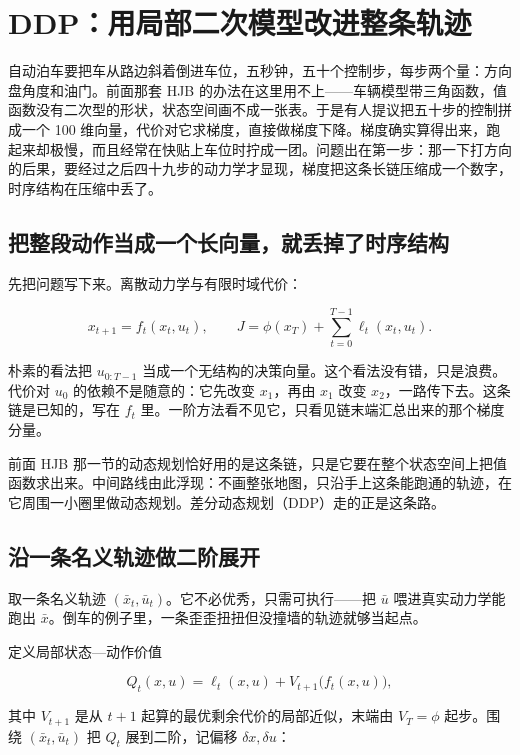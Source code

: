 \section{DDP：用局部二次模型改进整条轨迹}
\label{sec:16-Control-and-Reinforcement-Learning/01-Optimal-Control/06}

自动泊车要把车从路边斜着倒进车位，五秒钟，五十个控制步，每步两个量：方向盘角度和油门。前面那套 HJB 的办法在这里用不上——车辆模型带三角函数，值函数没有二次型的形状，状态空间画不成一张表。于是有人提议把五十步的控制拼成一个 100 维向量，代价对它求梯度，直接做梯度下降。梯度确实算得出来，跑起来却极慢，而且经常在快贴上车位时拧成一团。问题出在第一步：那一下打方向的后果，要经过之后四十九步的动力学才显现，梯度把这条长链压缩成一个数字，时序结构在压缩中丢了。

\subsection{把整段动作当成一个长向量，就丢掉了时序结构}

先把问题写下来。离散动力学与有限时域代价：

\[
x_{t+1} = f_t(x_t, u_t),
\qquad
J = \phi(x_T) + \sum_{t=0}^{T-1} \ell_t(x_t, u_t).
\]

朴素的看法把 \(u_{0:T-1}\) 当成一个无结构的决策向量。这个看法没有错，只是浪费。代价对 \(u_0\) 的依赖不是随意的：它先改变 \(x_1\)，再由 \(x_1\) 改变 \(x_2\)，一路传下去。这条链是已知的，写在 \(f_t\) 里。一阶方法看不见它，只看见链末端汇总出来的那个梯度分量。

前面 HJB 那一节的动态规划恰好用的是这条链，只是它要在整个状态空间上把值函数求出来。中间路线由此浮现：不画整张地图，只沿手上这条能跑通的轨迹，在它周围一小圈里做动态规划。差分动态规划（DDP）走的正是这条路。

\subsection{沿一条名义轨迹做二阶展开}

取一条名义轨迹 \((\bar x_t, \bar u_t)\)。它不必优秀，只需可执行——把 \(\bar u\) 喂进真实动力学能跑出 \(\bar x\)。倒车的例子里，一条歪歪扭扭但没撞墙的轨迹就够当起点。

定义局部状态---动作价值

\[
Q_t(x,u) = \ell_t(x,u) + V_{t+1}\bigl(f_t(x,u)\bigr),
\]

其中 \(V_{t+1}\) 是从 \(t+1\) 起算的最优剩余代价的局部近似，末端由 \(V_T = \phi\) 起步。围绕 \((\bar x_t,\bar u_t)\) 把 \(Q_t\) 展到二阶，记偏移 \(\delta x, \delta u\)：

